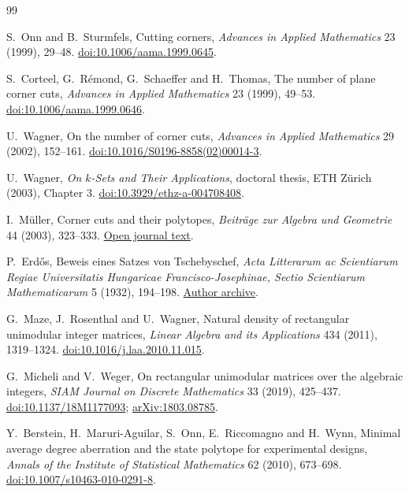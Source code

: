 \documentclass[11pt,a4paper]{article}
\theoremstyle{remark}
\begin{document}
\begin{thebibliography}{99}
\small
\raggedright
\setlength{\itemsep}{2pt}
S.~Onn and B.~Sturmfels,
Cutting corners,
\emph{Advances in Applied Mathematics} 23 (1999), 29--48.
\href{https://doi.org/10.1006/aama.1999.0645}{doi:10.1006/aama.1999.0645}.

S.~Corteel, G.~R\'emond, G.~Schaeffer and H.~Thomas,
The number of plane corner cuts,
\emph{Advances in Applied Mathematics} 23 (1999), 49--53.
\href{https://doi.org/10.1006/aama.1999.0646}{doi:10.1006/aama.1999.0646}.

U.~Wagner,
On the number of corner cuts,
\emph{Advances in Applied Mathematics} 29 (2002), 152--161.
\href{https://doi.org/10.1016/S0196-8858(02)00014-3}{doi:10.1016/S0196-8858(02)00014-3}.

U.~Wagner,
\emph{On \(k\)-Sets and Their Applications},
doctoral thesis, ETH Z\"urich (2003), Chapter 3.
\href{https://doi.org/10.3929/ethz-a-004708408}{doi:10.3929/ethz-a-004708408}.

I.~M\"uller,
Corner cuts and their polytopes,
\emph{Beitr\"age zur Algebra und Geometrie} 44 (2003), 323--333.
\href{https://ftp.gwdg.de/pub/misc/EMIS/journals/BAG/vol.44/no.2/b44h2mue.pdf}{Open journal text}.

P.~Erd\H{o}s,
Beweis eines Satzes von Tschebyschef,
\emph{Acta Litterarum ac Scientiarum Regiae Universitatis Hungaricae
Francisco-Josephinae, Sectio Scientiarum Mathematicarum} 5 (1932), 194--198.
\href{https://users.renyi.hu/~p_erdos/1932-01.pdf}{Author archive}.

G.~Maze, J.~Rosenthal and U.~Wagner,
Natural density of rectangular unimodular integer matrices,
\emph{Linear Algebra and its Applications} 434 (2011), 1319--1324.
\href{https://doi.org/10.1016/j.laa.2010.11.015}{doi:10.1016/j.laa.2010.11.015}.

G.~Micheli and V.~Weger,
On rectangular unimodular matrices over the algebraic integers,
\emph{SIAM Journal on Discrete Mathematics} 33 (2019), 425--437.
\href{https://doi.org/10.1137/18M1177093}{doi:10.1137/18M1177093};
\href{https://arxiv.org/abs/1803.08785}{arXiv:1803.08785}.

Y.~Berstein, H.~Maruri-Aguilar, S.~Onn, E.~Riccomagno and H.~Wynn,
Minimal average degree aberration and the state polytope for experimental designs,
\emph{Annals of the Institute of Statistical Mathematics} 62 (2010), 673--698.
\href{https://doi.org/10.1007/s10463-010-0291-8}{doi:10.1007/s10463-010-0291-8}.


\end{thebibliography}
\end{document}
